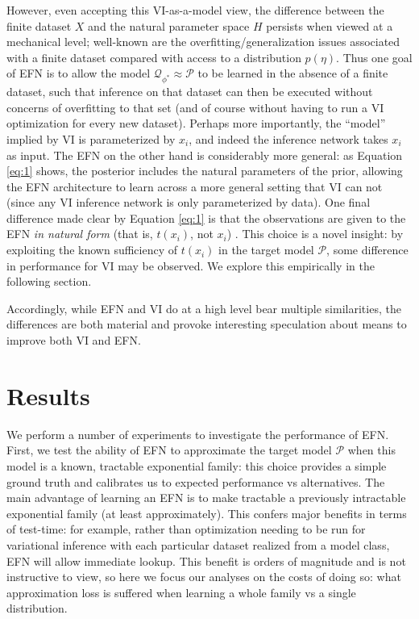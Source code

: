 \documentclass[twoside]{article}
\begin{document}
However, even accepting this VI-as-a-model view, the difference between the finite dataset $X$ and the natural parameter space $H$ persists when viewed at a mechanical level; well-known are the overfitting/generalization issues associated with a finite dataset compared with access to a distribution $p(\eta)$.    Thus one goal of EFN is to allow the model $\mathcal{Q}_{\phi^*} \approx \mathcal{P}$ to be learned in the absence of a finite dataset, such that inference on that dataset can then be executed without concerns of overfitting to that set (and of course without having to run a VI optimization for every new dataset).   Perhaps more importantly, the ``model'' implied by VI is parameterized by $x_i$, and indeed the inference network takes $x_i$ as input.  The EFN on the other hand is considerably more general:  as Equation \ref{eq:1} shows, the posterior includes the natural parameters of the prior, allowing the EFN architecture to learn across a more general setting that VI can not (since any VI inference network is only parameterized by data).  One final difference made clear by Equation \ref{eq:1} is that the observations are given to the EFN \emph{in natural form} (that is, $t(x_i)$, not $x_i$) \cite{robert2007bayesian}.  This choice is a novel insight: by exploiting the known sufficiency of $t(x_i)$ in the target model $\mathcal{P}$, some difference in performance for VI may be observed.  We explore this empirically in the following section.

Accordingly, while EFN and VI do at a high level bear multiple similarities, the differences are both material and provoke interesting speculation about means to improve both VI and EFN.


\section{Results}

We perform a number of experiments to investigate the performance of EFN.  First, we test the ability of EFN to approximate the target model $\mathcal{P}$ when this model is a known, tractable exponential family: this choice provides a simple ground truth and calibrates us to expected performance vs alternatives.    The main advantage of learning an EFN is to make tractable a previously intractable exponential family (at least approximately).  This confers major benefits in terms of test-time: for example, rather than optimization needing to be run for variational inference with each particular dataset realized from a model class, EFN will allow immediate lookup.  This benefit is orders of magnitude and is not instructive to view, so here we focus our analyses on the costs of doing so: what approximation loss is suffered when learning a whole family vs a single distribution.  
\end{document}
